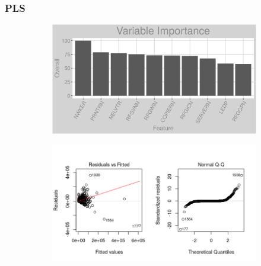 \subsubsection{PLS}
\label{appendix:natural_gas:pls}
\begin{figure}[h]
\centering
\begin{subfigure}{1\textwidth}
\centering
\includegraphics[width=.99\textwidth, height=0.3\textheight]{Images/natural_gas_pls_vars.png}
\end{subfigure}
\begin{subfigure}{1\textwidth}
\centering
\includegraphics[width=.99\textwidth, height=0.475\textheight]{Images/natural_gas_pls_res_1.png}
\end{subfigure}
\end{figure}
\FloatBarrier
\newpage
